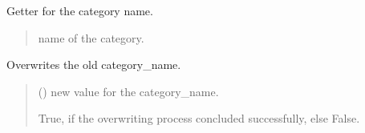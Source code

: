 \documentclass[letterpaper,10pt,english]{sphinxmanual}
\begin{document}
\begin{fulllineitems}
\begin{fulllineitems}
\begin{quote}
\begin{description}
\end{description}\end{quote}

\end{fulllineitems}


\begin{fulllineitems}
\label{\detokenize{apidoc/src.osm_configurator.model.project.configuration:src.osm_configurator.model.project.configuration.category.Category.get_category_name}}
\pysigstartsignatures
{}
\pysigstopsignatures
\sphinxAtStartPar
Getter for the category name.
\begin{quote}\begin{description}
\sphinxAtStartPar
name of the category.

\sphinxAtStartPar
{}

\end{description}\end{quote}

\end{fulllineitems}


\begin{fulllineitems}
\label{\detokenize{apidoc/src.osm_configurator.model.project.configuration:src.osm_configurator.model.project.configuration.category.Category.set_category_name}}
\pysigstartsignatures
{}
\pysigstopsignatures
\sphinxAtStartPar
Overwrites the old category\_name.
\begin{quote}\begin{description}
\sphinxAtStartPar
{} () \textendash{} new value for the category\_name.

\sphinxAtStartPar
True, if the overwriting process concluded successfully, else False.


\end{description}
\end{quote}
\end{fulllineitems}
\end{fulllineitems}
\end{document}
